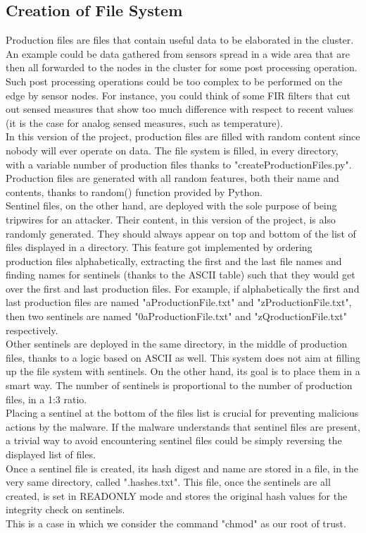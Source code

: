 \subsection{Creation of File System}
Production files are files that contain useful data to be elaborated in the cluster. An example could be data gathered from sensors spread in a wide area that are then all forwarded to the nodes in the cluster for some post processing operation. Such post processing operations could be too complex to be performed on the edge by sensor nodes. For instance, you could think of some FIR filters that cut out sensed measures that show too much difference with respect to recent values (it is the case for analog sensed measures, such as temperature).\\
In this version of the project, production files are filled with random content since nobody will ever operate on data. The file system is filled, in every directory, with a variable number of production files thanks to "createProductionFiles.py".
Production files are generated with all random features, both their name and contents, thanks to random() function provided by Python.\\
Sentinel files, on the other hand, are deployed with the sole purpose of being tripwires for an attacker. Their content, in this version of the project, is also randomly generated. They should always appear on top and bottom of the list of files displayed in a directory. This feature got implemented by ordering production files alphabetically, extracting the first and the last file names and finding names for sentinels (thanks to the ASCII table) such that they would get over the first and last production files. For example, if alphabetically the first and last production files are named "aProductionFile.txt" and "zProductionFile.txt", then two sentinels are named "0aProductionFile.txt" and "zQroductionFile.txt" respectively.\\
Other sentinels are deployed in the same directory, in the middle of production files, thanks to a logic based on ASCII as well. This system does not aim at filling up the file system with sentinels. On the other hand, its goal is to place them in a smart way. The number of sentinels is proportional to the number of production files, in a 1:3 ratio.\\
Placing a sentinel at the bottom of the files list is crucial for preventing malicious actions by the malware. If the malware understands that sentinel files are present, a trivial way to avoid encountering sentinel files could be simply reversing the displayed list of files.\\
Once a sentinel file is created, its hash digest and name are stored in a file, in the very same directory, called ".hashes.txt". This file, once the sentinels are all created, is set in READONLY mode and stores the original hash values for the integrity check on sentinels.\\
This is a case in which we consider the command "chmod" as our root of trust.\\


